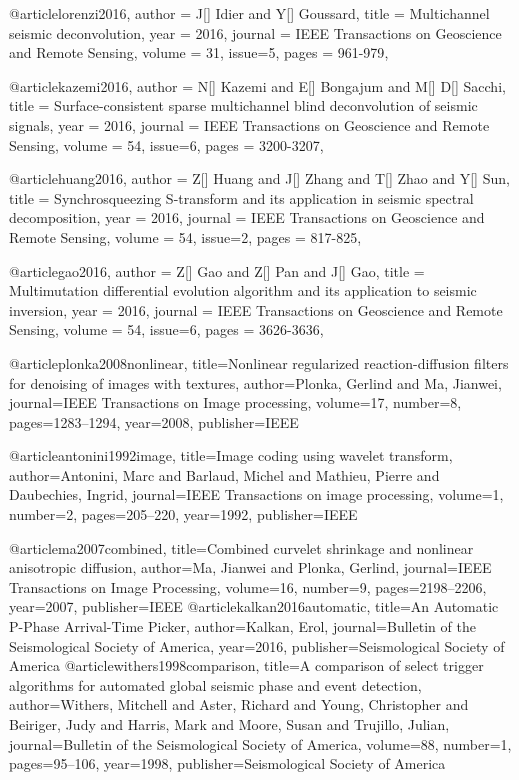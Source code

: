 @article{lorenzi2016,
  author =	 {J[] Idier and Y[] Goussard},
  title =	 {Multichannel seismic deconvolution},
  year =	 2016,
  journal =	 {IEEE Transactions on Geoscience and Remote Sensing},
  volume =	 31,
  issue=5,
  pages =	 {961-979},
}

@article{kazemi2016,
  author =	 {N[] Kazemi and E[] Bongajum and M[] D[] Sacchi},
  title =	 {Surface-consistent sparse multichannel blind deconvolution of seismic signals},
  year =	 2016,
  journal =	 {IEEE Transactions on Geoscience and Remote Sensing},
  volume =	 54,
  issue=6,
  pages =	 {3200-3207},
}

@article{huang2016,
  author =	 {Z[] Huang and J[] Zhang and T[] Zhao and Y[] Sun},
  title =	 {Synchrosqueezing {S}-transform and its application in seismic spectral decomposition},
  year =	 2016,
  journal =	 {IEEE Transactions on Geoscience and Remote Sensing},
  volume =	 54,
  issue=2,
  pages =	 {817-825},
}

@article{gao2016,
  author =	 {Z[] Gao and Z[] Pan and J[] Gao},
  title =	 {Multimutation differential evolution algorithm and its application to seismic inversion},
  year =	 2016,
  journal =	 {IEEE Transactions on Geoscience and Remote Sensing},
  volume =	 54,
  issue=6,
  pages =	 {3626-3636},
}


@article{plonka2008nonlinear,
  title={Nonlinear regularized reaction-diffusion filters for denoising of images with textures},
  author={Plonka, Gerlind and Ma, Jianwei},
  journal={IEEE Transactions on Image processing},
  volume={17},
  number={8},
  pages={1283--1294},
  year={2008},
  publisher={IEEE}
}

@article{antonini1992image,
  title={Image coding using wavelet transform},
  author={Antonini, Marc and Barlaud, Michel and Mathieu, Pierre and Daubechies, Ingrid},
  journal={IEEE Transactions on image processing},
  volume={1},
  number={2},
  pages={205--220},
  year={1992},
  publisher={IEEE}
}

@article{ma2007combined,
  title={Combined curvelet shrinkage and nonlinear anisotropic diffusion},
  author={Ma, Jianwei and Plonka, Gerlind},
  journal={IEEE Transactions on Image Processing},
  volume={16},
  number={9},
  pages={2198--2206},
  year={2007},
  publisher={IEEE}
}
@article{kalkan2016automatic,
  title={An Automatic P-Phase Arrival-Time Picker},
  author={Kalkan, Erol},
  journal={Bulletin of the Seismological Society of America},
  year={2016},
  publisher={Seismological Society of America}
}
@article{withers1998comparison,
  title={A comparison of select trigger algorithms for automated global seismic phase and event detection},
  author={Withers, Mitchell and Aster, Richard and Young, Christopher and Beiriger, Judy and Harris, Mark and Moore, Susan and Trujillo, Julian},
  journal={Bulletin of the Seismological Society of America},
  volume={88},
  number={1},
  pages={95--106},
  year={1998},
  publisher={Seismological Society of America}
}



